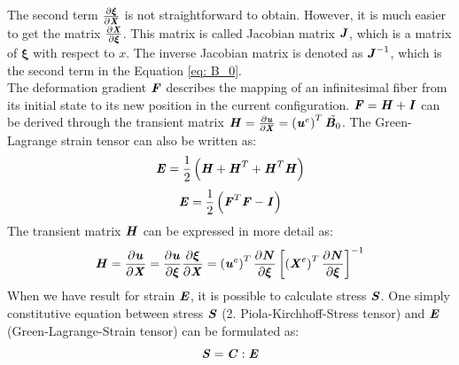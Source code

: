 The second term $\frac{\partial \boldsymbol{\xi}}{\partial \textbf{\textit{X}}}$ is not straightforward to obtain. However, it is much easier to get the matrix $\frac{\partial \textbf{\textit{X}}}{\partial \boldsymbol{\xi}}$. This matrix is called Jacobian matrix $\textbf{\textit{J}}$, which is a matrix of $\boldsymbol{\xi}$ with respect to $x$. The inverse Jacobian matrix is denoted as $\textbf{\textit{J}}^{-1}$, which is the second term in the Equation \ref{eq: B_0}. \\
The deformation gradient $\textbf{\textit{F}}$ describes the mapping of an infinitesimal fiber from its initial state to its new position in the current configuration.    $\textbf{\textit{F}} = \textbf{\textit{H}} + \textbf{\textit{I}}$ can be derived through the transient matrix $\textbf{\textit{H}} = \frac{\partial \textbf{\textit{u}}}{\partial \textbf{\textit{X}}} = \left(\textbf{\textit{u}}^e\right)^T \tilde{\textbf{\textit{B}}_0}$.  The Green-Lagrange strain tensor can also be written as:
\begin{equation}
\textbf{\textit{E}} = \frac{1}{2} \left(\textbf{\textit{H}} + \textbf{\textit{H}}^T + \textbf{\textit{H}}^T \textbf{\textit{H}}\right)
\end{equation}
\begin{equation} \label{eq: E_eq}
\textbf{\textit{E}} = \frac{1}{2} \left(\textbf{\textit{F}}^T \textbf{\textit{F}} - \textbf{\textit{I}}\right)
\end{equation}
The transient matrix $\textbf{\textit{H}}$ can be expressed in more detail as:
\begin{equation} \label{eq: Help_matrix}
\textbf{\textit{H}} = \frac{\partial \textbf{\textit{u}}}{\partial \textbf{\textit{X}}} = \frac{\partial \textbf{\textit{u}}}{\partial \boldsymbol{\xi}} \frac{\partial \boldsymbol{\xi}}{\partial \textbf{\textit{X}}} = \left(\textbf{\textit{u}}^e\right)^T \frac{\partial \textbf{\textit{N}}}{\partial \boldsymbol{\xi}} \left[ \left(\textbf{\textit{X}}^e\right)^T \frac{\partial \textbf{\textit{N}}}{\partial \boldsymbol{\xi}}\right]^{-1}
\end{equation}
 When we have result for strain $\textbf{\textit{E}}$, it is possible to calculate stress $\textbf{\textit{S}}$. One simply constitutive equation between stress $\textbf{\textit{S}}$ (2. Piola-Kirchhoff-Stress tensor) and $\textbf{\textit{E}}$ (Green-Lagrange-Strain tensor) can be formulated as:
\begin{equation}
\textbf{\textit{S}} = \textbf{\textit{C}} : \textbf{\textit{E}}
\end{equation}
